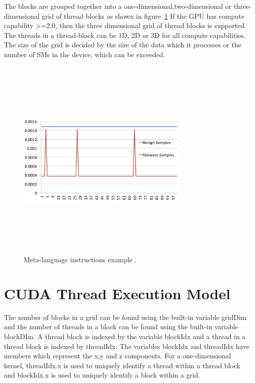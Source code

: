 The blocks are grouped together into a one-dimensional,two-dimensional or three-dimensional grid of thread blocks as shown in figure~\ref{fig:cudablock} If the GPU has compute capability >=2.0, then the three dimensional grid of thread blocks is supported. The threads in a thread-block can be  1D, 2D or 3D for all compute capabilities. The size of the grid is decided by the size of the data which it processes or the number of SMs in the device, which can be exceeded.

\begin{figure}
	\centering
	\includegraphics[width=8.4cm, height=10cm]{500.png}
	\caption[Meta-language instructions example]{Meta-language instructions example \cite{bib4}.}
	\label{fig:cudablock}
\end{figure}


\section{CUDA Thread Execution Model} 

The number of blocks in a grid can be found using the built-in variable gridDim and the number of threads in a block can be found using the built-in variable blockDIm. A thread block is indexed by the variable blockIdx and a thread in a thread block is indexed by threadIdx. The variables blockIdx and threadIdx have members which represent the x,y and z components. For a one-dimensional kernel, threadIdx.x is used to uniquely identify a thread within a thread block and blockIdx.x is used to uniquely identify a block within a grid.

